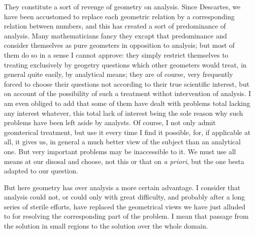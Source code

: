 \documentclass[12pt,oneside]{book}
\begin{document}
They constitute a sort of revenge of geometry on analysis. Since Descartes, we have been accustomed to replace each geometric relation by a corresponding relation between numbers, and this has created a sort of predominance of analysis. Many mathematicians fancy they excapt that predominance and consider themselves as pure geometers in opposition to analysis; but most of them do so in a sense I cannot approve: they simply restrict themselves to treating exclusively by geogetry questions which other geometers would treat, in general quite easily, by analytical means; they are of course, very frequently forced to choose their questions not according to their true scientific interest, but on account of the possibility of such a treatment withot intervention of analysis. I am even obliged to add that some of them have dealt with problems total lacking any interest whatever, this total lack of interest being the sole reason why such problems have been left aside by analysts. Of course, I not only admit geomterical treatment, but use it every time I find it possible, for, if applicable at all, it gives us, in general a much better view of the subject than an analytical one. But very important problems may be inaccessible to it. We must use all means at our disosal and choose, not this or that on \textit{a priori}, but the one besta adapted to our question. \par 

But here geometry has over analysis a more certain advantage. I consider that analysis could not, or could only with great difficulty, and probably after a long series of sterile efforts, have replaced the geometrical views we have just alluded to for resolving the corresponding part of the problem. I mean that passage from the solution in small regions to the solution over the whole domain.\footnotemark \par 

\end{document}
